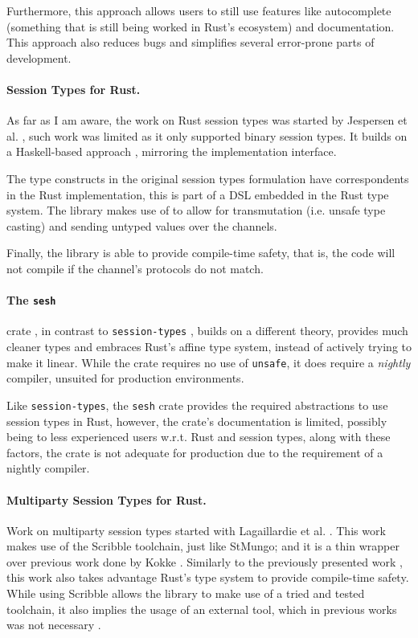 Furthermore, this approach allows users to still use features like autocomplete
(something that is still being worked in Rust's ecosystem) and documentation.
This approach also reduces bugs and simplifies several error-prone parts of development.

\paragraph{Session Types for Rust.}
As far as I am aware, the work on Rust session types was started by Jespersen et al. \autocite{Jespersen2015},
such work was limited as it only supported binary session types.
It builds on a Haskell-based approach \autocite{Pucella2008}, mirroring the implementation interface.

The type constructs in the original session types formulation have correspondents in the Rust implementation,
this is part of a DSL embedded in the Rust type system.
The library makes use of  to allow for transmutation (i.e. unsafe type casting)
and sending untyped values over the channels.

Finally, the library is able to provide compile-time safety, that is,
the code will not compile if the channel's protocols do not match.

\paragraph{The \texttt{sesh}} crate \cite{Kokke2019}, in contrast to \texttt{session-types} \autocite{Jespersen2015},
builds on a different theory, provides much cleaner types and embraces Rust's affine type system,
instead of actively trying to make it linear.
While the crate requires no use of \texttt{unsafe}, it does require a \emph{nightly} compiler,
unsuited for production environments.

Like \texttt{session-types}, the \texttt{sesh} crate provides the required abstractions to use session types in Rust,
however, the crate's documentation is limited, possibly being  to less experienced users
w.r.t. Rust and session types, along with these factors,
the crate is not adequate for production due to the requirement of a nightly compiler.

\paragraph{Multiparty Session Types for Rust.}
Work on multiparty session types started with Lagaillardie et al. \autocite{Lagaillardie2020}.
This work makes use of the Scribble \autocite{Yoshida2014} toolchain, just like StMungo;
and it is a thin wrapper over previous work done by Kokke \autocite{Kokke2019}.
Similarly to the previously presented work \autocite{Jespersen2015},
this work also takes advantage Rust's type system to provide compile-time safety.
While using Scribble allows the library to make use of a tried and tested toolchain,
it also implies the usage of an external tool, which in previous works was not necessary \autocite{Jespersen2015, Kokke2019}.

